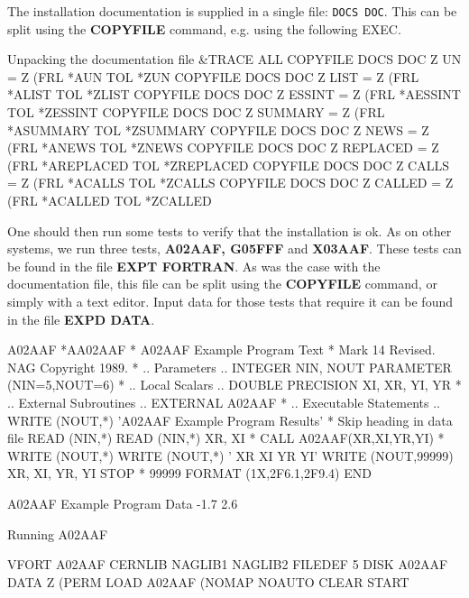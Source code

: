 The installation documentation is supplied in a single file: {\tt DOCS DOC}.
This can be split using the {\bf COPYFILE} command, e.g. using the following
EXEC.

\begin{XMPt}{Unpacking the documentation file}
&TRACE ALL
COPYFILE DOCS DOC Z UN = Z (FRL *AUN TOL *ZUN
COPYFILE DOCS DOC Z LIST = Z (FRL *ALIST TOL *ZLIST
COPYFILE DOCS DOC Z ESSINT = Z (FRL *AESSINT TOL *ZESSINT
COPYFILE DOCS DOC Z SUMMARY = Z (FRL *ASUMMARY TOL *ZSUMMARY
COPYFILE DOCS DOC Z NEWS = Z (FRL *ANEWS TOL *ZNEWS
COPYFILE DOCS DOC Z REPLACED = Z (FRL *AREPLACED TOL *ZREPLACED
COPYFILE DOCS DOC Z CALLS = Z (FRL *ACALLS TOL *ZCALLS
COPYFILE DOCS DOC Z CALLED = Z (FRL *ACALLED TOL *ZCALLED
\end{XMPt}

One should then run some tests to verify that the installation
is ok. As on other systems, we run three tests, {\bf A02AAF, G05FFF} and
{\bf X03AAF}. These tests can be found in the file {\bf EXPT FORTRAN}.
As was the case with the documentation file, this file can be split using
the {\bf COPYFILE} command, or simply with a text editor. Input data for
those tests that require it can be found in the file {\bf EXPD DATA}.

\begin{XMPt}{A02AAF}
*AA02AAF
*     A02AAF Example Program Text
*     Mark 14 Revised.  NAG Copyright 1989.
*     .. Parameters ..
      INTEGER          NIN, NOUT
      PARAMETER        (NIN=5,NOUT=6)
*     .. Local Scalars ..
      DOUBLE PRECISION XI, XR, YI, YR
*     .. External Subroutines ..
      EXTERNAL         A02AAF
*     .. Executable Statements ..
      WRITE (NOUT,*) 'A02AAF Example Program Results'
*     Skip heading in data file
      READ (NIN,*)
      READ (NIN,*) XR, XI
*
      CALL A02AAF(XR,XI,YR,YI)
*
      WRITE (NOUT,*)
      WRITE (NOUT,*) '   XR    XI      YR       YI'
      WRITE (NOUT,99999) XR, XI, YR, YI
      STOP
*
99999 FORMAT (1X,2F6.1,2F9.4)
      END


A02AAF Example Program Data                                                     
 -1.7 2.6                                                                       

\end{XMPt}

\begin{XMPt}{Running A02AAF}

VFORT A02AAF
CERNLIB NAGLIB1 NAGLIB2
FILEDEF 5 DISK A02AAF DATA Z (PERM
LOAD A02AAF (NOMAP NOAUTO CLEAR START

\end{XMPt}

